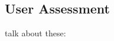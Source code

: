 \subsection{User Assessment} \label{sec:user_assessment}
talk about these: \citet{Yu2018-qw, Wickens1999-la, Riley1996-qm, Muir1996-gt, Desai2012-rc}
